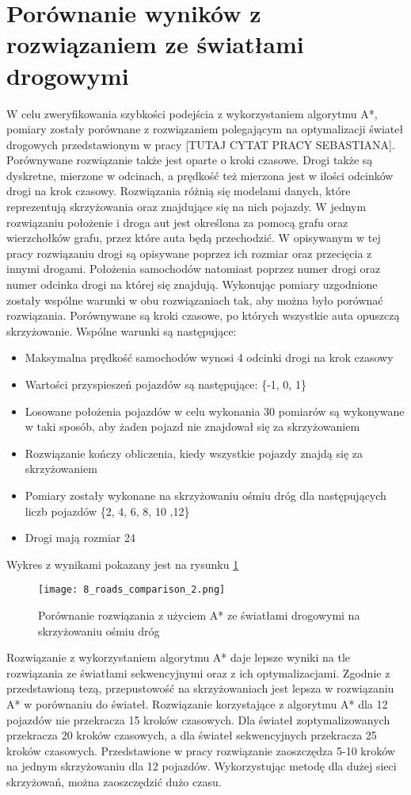 \section{Porównanie wyników z rozwiązaniem ze światłami drogowymi}

W celu zweryfikowania szybkości podejścia z wykorzystaniem algorytmu A*, pomiary zostały porównane z rozwiązaniem polegającym na optymalizacji świateł drogowych przedstawionym w pracy [TUTAJ CYTAT PRACY SEBASTIANA]. Porównywane rozwiązanie także jest oparte o kroki czasowe. Drogi także są dyskretne, mierzone w odcinach, a prędkość też mierzona jest w ilości odcinków drogi na krok czasowy.
\newline
\indent
Rozwiązania różnią się modelami danych, które reprezentują skrzyżowania oraz znajdujące się na nich pojazdy. W jednym rozwiązaniu położenie i droga aut jest określona za pomocą grafu oraz wierzchołków grafu, przez które auta będą przechodzić. W opisywanym w tej pracy rozwiązaniu drogi są opisywane poprzez ich rozmiar oraz przecięcia z innymi drogami. Położenia samochodów natomiast poprzez numer drogi oraz numer odcinka drogi na której się znajdują.
\newline
\indent
Wykonując pomiary uzgodnione zostały wspólne warunki w obu rozwiązaniach tak, aby można było porównać rozwiązania. Porównywane są kroki czasowe, po których wszystkie auta opuszczą skrzyżowanie. Wspólne warunki są następujące:
\begin{itemize}
\item Maksymalna prędkość samochodów wynosi 4 odcinki drogi na krok czasowy
\item Wartości przyspieszeń pojazdów są następujące: \{-1, 0, 1\}
\item Losowane położenia pojazdów w celu wykonania 30 pomiarów są wykonywane w taki sposób, aby żaden pojazd nie znajdował się za skrzyżowaniem
\item Rozwiązanie kończy obliczenia, kiedy wszystkie pojazdy znajdą się za skrzyżowaniem
\item Pomiary zostały wykonane na skrzyżowaniu ośmiu dróg dla następujących liczb pojazdów \{2, 4, 6, 8, 10 ,12\}
\item Drogi mają rozmiar 24
\end{itemize}
Wykres z wynikami pokazany jest na rysunku \ref{comparison}
\begin{figure}[H]
  \texttt{[image: 8\_roads\_comparison\_2.png]}
  \caption{Porównanie rozwiązania z użyciem A* ze światłami drogowymi na skrzyżowaniu ośmiu dróg}
  \label{comparison}
\end{figure}
Rozwiązanie z wykorzystaniem algorytmu A* daje lepsze wyniki na tle rozwiązania ze światłami sekwencyjnymi oraz z ich optymalizacjami. Zgodnie z przedstawioną tezą, przepustowość na skrzyżowaniach jest lepsza w rozwiązaniu A* w porównaniu do świateł. Rozwiązanie korzystające z algorytmu A* dla 12 pojazdów nie przekracza 15 kroków czasowych. Dla świateł zoptymalizowanych przekracza 20 kroków czasowych, a dla świateł sekwencyjnych przekracza 25 kroków czasowych. Przedstawione w pracy rozwiązanie zaoszczędza 5-10 kroków na jednym skrzyżowaniu dla 12 pojazdów. Wykorzystując metodę dla dużej sieci skrzyżowań, można zaoszczędzić dużo czasu.
